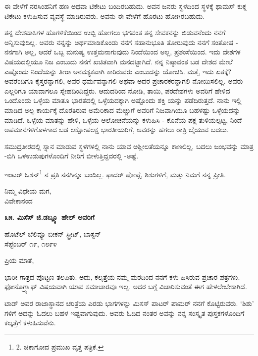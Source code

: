 ಈ ವೇಳೆಗೆ ನರಸಿಂಹನಿಗೆ ಹಣ ಅಥವಾ ಟಿಕೇಟು ಬಂದಿರಬಹುದು. ಅವನ ಜನರು ಸ್ಥಳದಿಂದ ಸ್ಥಳಕ್ಕೆ ಥಾಮಸ್ ಕುಕ್ನ ಟಿಕೇಟು ಕಳುಹಿಸುವ ವ್ಯವಸ್ಥೆ ಮಾಡಿರುವರು. ಅವನು ಈ ವೇಳೆಗೆ ಹೊರಟು ಹೋಗಿರಬಹುದು.

ತನ್ನ ದೇಶವಾಸಿಗಳ ಹೊಗಳಿಕೆಯಿಂದ ಉಬ್ಬಿ ಹೋಗಲು ಭಗವಂತ ತನ್ನ ಸೇವಕನನ್ನು ಬಿಡುವನೆಂದು ನನಗೆ ಅನ್ನಿಸುವುದಿಲ್ಲ. ಅವರು ನನ್ನನ್ನು ಅರ್ಥಮಾಡಿಕೊಂಡು ನನಗೆ ಸಹಾನುಭೂತಿ ತೋರುವುದು ನನಗೆ ಸಂತೋಷ - ನನಗಾಗಿ ಅಲ್ಲ, ಆದರೆ ಒಬ್ಬ ಮನುಷ್ಯ ಉತ್ತಮನಾಗುವುದು ನಿಂದೆಯಿಂದ ಅಲ್ಲ, ಪ್ರಶಂಸೆಯಿಂದ. ಇದು ದೇಶಗಳ ವಿಷಯದಲ್ಲಿಯೂ ನಿಜ ಎಂಬುದು ನನಗೆ ಖಚಿತವಾಗಿ ಮನದಟ್ಟಾಗಿದೆ. ನನ್ನ ನಿಷ್ಠಾವಂತ ಬಡ ದೇಶದ ಮೇಲೆ ಎಷ್ಟೊಂದು ನಿಂದೆಯನ್ನು ತೀರಾ ಅನವಶ್ಯಕವಾಗಿ ಕಾರಿರುವರು ಎಂಬುದನ್ನು ಯೋಚಿಸಿ. ಮತ್ತೆ, ಇದು ಏತಕ್ಕೆ? ಅವರೆಂದಿಗೂ ಕೈಸ್ತರನ್ನಾಗಲಿ, ಅವರ ಧರ್ಮವನ್ನಾಗಲಿ ಅಥವಾ ಅದರ ಪ್ರಚಾರಕರನ್ನಾಗಲಿ ನೋಯಿಸಲಿಲ್ಲ. ಅವರು ಎಲ್ಲರಿಗೂ ಯಾವಾಗಲೂ ಸ್ನೇಹದಿಂದಿದ್ದರು. ಆದುದರಿಂದ ನೋಡಿ, ತಾಯಿ, ಪರದೇಶಗಳು ಅವರಿಗೆ ಹೇಳಿದ ಒಂದೊಂದು ಒಳ್ಳೆಯ ಮಾತೂ ಭಾರತದಲ್ಲಿ ಒಳ್ಳೆಯದಕ್ಕಾಗಿ ಅಷ್ಟೊಂದು ಶಕ್ತಿ ಯನ್ನು ಪಡೆದಿರುತ್ತದೆ. ನಾನು ಇಲ್ಲಿ ಮಾಡಿದ ಅಲ್ಪ ಕಾರ್ಯಕ್ಕೆ ದೊರೆತಿರುವ ಅಮೆರಿಕಾದ ಮೆಚ್ಚುಗೆ ಅವರಿಗೆ ನಿಜವಾಗಿಯೂ ಬಹಳಷ್ಟು ಒಳ್ಳೆಯದನ್ನು ಮಾಡಿದೆ. ಒಳ್ಳೆಯ ಮಾತನ್ನು ಹೇಳಿ, ಒಳ್ಳೆಯ ಆಲೋಚನೆಯನ್ನು ಕಳುಹಿಸಿ - ಕೊನೆಯ ಪಕ್ಷ ತುಳಿಯಲ್ಪಟ್ಟ, ನಿಂದೆ ಅಪಮಾನಗಳಿಗೊಳಗಾದ ಬಡ ಲಕ್ಷೋಪಲಕ್ಷ ಭಾರತೀಯರಿಗೆ, ಅವರನ್ನು ಹಗಲು ರಾತ್ರಿ ಬೈಯುವ ಬದಲು.

ಸಮುದ್ರತೀರದಲ್ಲಿ ಸ್ನಾನ ಮಾಡುವ ಸ್ಥಳಗಳಲ್ಲಿ ನಾನು ಯಾವ ಅಶ್ಲೀಲತೆಯನ್ನೂ ಕಾಣಲಿಲ್ಲ, ಬದಲು ಜಂಭವನ್ನು ಮಾತ್ರ -ಬಿಗಿ ಒಳಉಡುಪುಗಳೊಂದಿಗೆ ನೀರಿಗೆ ಬೀಳುತ್ತಿದ್ದವರಲ್ಲಿ -ಅಷ್ಟೆ.

ಇಂಟರ್ ಓಶನ್\footnote{2. ಚಿಕಾಗೋದ ಪ್ರಮುಖ ವೃತ್ತ ಪತ್ರಿಕೆ.} ನ ಪ್ರತಿ ನನಗಿನ್ನೂ ಬಂದಿಲ್ಲ. ಫಾದರ್ ಪೋಪ್ಗೆ, ಶಿಶುಗಳಿಗೆ, ಮತ್ತು ನಿಮಗೆ ನನ್ನ ಪ್ರೀತಿ.

\begin{flushright}
ನಿಮ್ಮ ವಿಧೇಯ ಮಗ,\\ವಿವೇಕಾನಂದ
\end{flushright}

\begin{center}
\textbf{೩೫. ಮಿಸೆಸ್ ಜಿ.ಡಬ್ಲ್ಯೂ ಹೇಲ್ ಅವರಿಗೆ}
\end{center}

\begin{flushright}
ಹೊಟೆಲ್ ಬೆಲಿವ್ಯೂ ಬೀಕನ್ ಸ್ಟ್ರೀಟ್, ಬಾಸ್ಟನ್\\ಸೆಪ್ಟೆಂಬರ್ ೧೯, ೧೮೯೪
\end{flushright}

ಪ್ರಿಯ ಮಾತೆ,

ಭಾರೀ ಗಾತ್ರದ ಪೊಟ್ಟಣ ತಲಪಿತು. ಅದು, ಕಲ್ಕತ್ತೆಯ ನಮ್ಮ ಮಠದಿಂದ ನನಗೆ ಕಳು ಹಿಸಿರುವ ಪ್ರಚಾರ ಪತ್ರಗಳು. ಫೋನೊಗ್ರ್ಯಾಫ್ ವಿಷಯವಾಗಿ ಯಾವ ಸಮಾಚಾರವೂ ಇಲ್ಲ. ಅದರ ಬಗ್ಗೆ ವಿಚಾರಿಸುವಂತೆ ಈಗ ಹೇಳಲೇಬೇಕಾಗಿದೆ.

ಟಾಡ್ ಅವರ ರಾಜಾಸ್ಥಾನದ ಚರಿತ್ರೆಯ ಎರಡು ಭಾಗಗಳನ್ನು ಮಿಸಸ್ ಪಾಟರ್ ಪಾಮರ್ ನನಗೆ ಕೊಟ್ಟಿರುವರು. ‘ಶಿಶು’ ಗಳಿಗೆ ಅದನ್ನು ಓದಲು ಬಹಳ ಇಷ್ಟವಾಗುವುದು. ಅವರು ಓದಿದ ನಂತರ ಅವನ್ನು ನನ್ನ ಸಂಸ್ಕೃತ ಪುಸ್ತಕಗಳೊಂದಿಗೆ ಕಲ್ಕತ್ತೆಗೆ ಕಳುಹಿಸುವೆನು.

